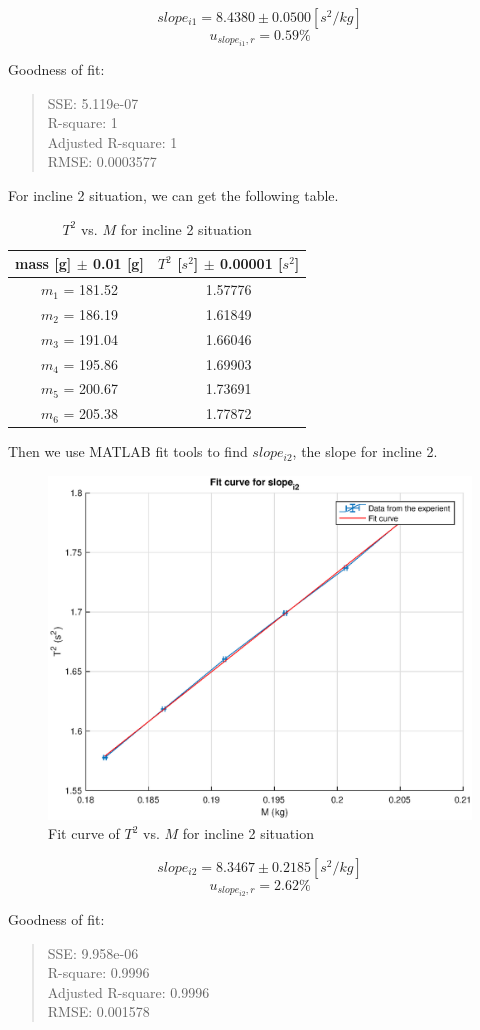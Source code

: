$$slope_{i1} = 8.4380 \pm 0.0500 [s^2/kg] $$
$$ u_{slope_{i1},r} = 0.59 \% $$

Goodness of fit:
\begin{quote}
	\centering
  SSE: 5.119e-07 \\ 
  R-square: 1 \\ 
  Adjusted R-square: 1 \\ 
  RMSE: 0.0003577 \\ 
\end{quote}

For incline 2 situation, we can get the following table.

\begin{table}[H]
	\centering
	\begin{tabular}{|c|c|}
	\hline
	mass [g] $\pm$ 0.01 [g] & $T^2$ [$s^2$] $\pm$ 0.00001 [$s^2$] \\ \hline
	$m_1$ = 181.52  & 1.57776 \\ \hline
	$m_2$ = 186.19  & 1.61849 \\ \hline
	$m_3$ = 191.04  & 1.66046 \\ \hline
	$m_4$ = 195.86  & 1.69903 \\ \hline
	$m_5$ = 200.67  & 1.73691 \\ \hline
	$m_6$ = 205.38  & 1.77872 \\ \hline
	\end{tabular}
	\caption{$T^2$ vs. $M$ for incline 2 situation}
	\label{T2vsM_2}
\end{table}

Then we use MATLAB fit tools to find $slope_{i2}$, the slope for incline 2.

\begin{figure}[H]
	\centering
	\includegraphics[width=15cm]{matlab/fitfig/m3}
	\caption{Fit curve of $T^2$ vs. $M$ for incline 2 situation}
\end{figure}

$$slope_{i2} = 8.3467 \pm 0.2185 [s^2/kg] $$
$$ u_{slope_{i2},r} = 2.62 \% $$

Goodness of fit:
\begin{quote}
	\centering
  SSE: 9.958e-06 \\
  R-square: 0.9996 \\
  Adjusted R-square: 0.9996 \\
  RMSE: 0.001578 \\
\end{quote}






